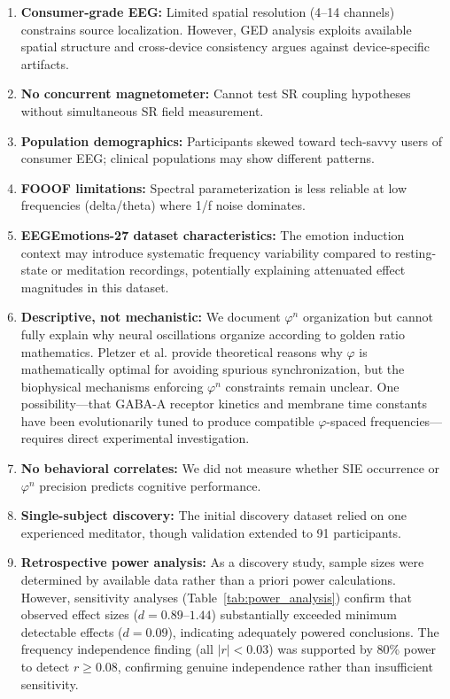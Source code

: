 \documentclass[11pt,a4paper]{article}
\newcommand{\phisym}{\varphi}
\begin{document}
\begin{enumerate}
    \item \textbf{Consumer-grade EEG:} Limited spatial resolution (4--14 channels) constrains source localization. However, GED analysis exploits available spatial structure and cross-device consistency argues against device-specific artifacts.

    \item \textbf{No concurrent magnetometer:} Cannot test SR coupling hypotheses without simultaneous SR field measurement.

    \item \textbf{Population demographics:} Participants skewed toward tech-savvy users of consumer EEG; clinical populations may show different patterns.

    \item \textbf{FOOOF limitations:} Spectral parameterization is less reliable at low frequencies (delta/theta) where 1/f noise dominates.

    \item \textbf{EEGEmotions-27 dataset characteristics:} The emotion induction context may introduce systematic frequency variability compared to resting-state or meditation recordings, potentially explaining attenuated effect magnitudes in this dataset.

    \item \textbf{Descriptive, not mechanistic:} We document $\phisym^n$ organization but cannot fully explain why neural oscillations organize according to golden ratio mathematics. Pletzer et al. \parencite{pletzer2010golden} provide theoretical reasons why $\phisym$ is mathematically optimal for avoiding spurious synchronization, but the biophysical mechanisms enforcing $\phisym^n$ constraints remain unclear. One possibility---that GABA-A receptor kinetics and membrane time constants have been evolutionarily tuned to produce compatible $\phisym$-spaced frequencies---requires direct experimental investigation.

    \item \textbf{No behavioral correlates:} We did not measure whether SIE occurrence or $\phisym^n$ precision predicts cognitive performance.

    \item \textbf{Single-subject discovery:} The initial discovery dataset relied on one experienced meditator, though validation extended to 91 participants.

    \item \textbf{Retrospective power analysis:} As a discovery study, sample sizes were determined by available data rather than a priori power calculations. However, sensitivity analyses (Table~\ref{tab:power_analysis}) confirm that observed effect sizes ($d = 0.89$--$1.44$) substantially exceeded minimum detectable effects ($d = 0.09$), indicating adequately powered conclusions. The frequency independence finding (all $|r| < 0.03$) was supported by 80\% power to detect $r \geq 0.08$, confirming genuine independence rather than insufficient sensitivity.


\end{enumerate}
\end{document}
